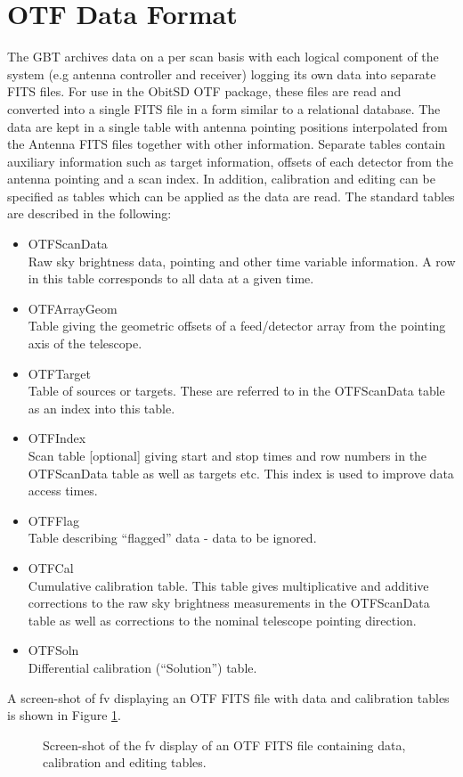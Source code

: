\documentclass[11pt]{report}
\begin{document}
\section{OTF Data Format \label{OTFformat}}
The GBT archives data on a per scan basis with each logical component
of the system (e.g antenna controller and receiver) logging its own
data into separate FITS files.
For use in the ObitSD OTF package, these files are read and converted
into a single FITS file in a form similar to a relational database.
The data are kept in a single table with antenna pointing positions
interpolated from the Antenna FITS files together with other
information.
Separate tables contain auxiliary information such as target
information, offsets of each detector from the antenna pointing and a
scan index.
In addition, calibration and editing can be specified as tables which
can be applied as the data are read.
The standard tables are described in the following:
\begin{itemize}
\item  OTFScanData\\
Raw sky brightness data, pointing and other time variable
information.
A row in this table corresponds to all data at a given time.
\item  OTFArrayGeom\\
Table giving the geometric offsets of a feed/detector array from the
pointing axis of the telescope.
\item  OTFTarget\\
Table of sources or targets. 
These are referred to in the OTFScanData table as an index into this table.
\item  OTFIndex\\
Scan table [optional] giving start and stop times and row numbers in
the OTFScanData table as well as targets etc.
This index is used to improve data access times.
\item  OTFFlag\\
Table describing ``flagged'' data - data to be ignored.
\item  OTFCal\\
Cumulative calibration table.
This table gives multiplicative and additive corrections to the raw
sky brightness measurements in the OTFScanData table as well as
corrections to the nominal telescope pointing direction.
\item  OTFSoln\\
Differential calibration (``Solution'') table.
\end{itemize}
A screen-shot of fv displaying an OTF FITS file with data and
calibration tables is shown in Figure \ref{OTFFITS}.
\begin{figure}
\centerline{}
\caption{ 
Screen-shot of the fv display of an OTF FITS file containing data,
calibration and editing tables.
}
\label{OTFFITS}
\end{figure}
\end{document}
